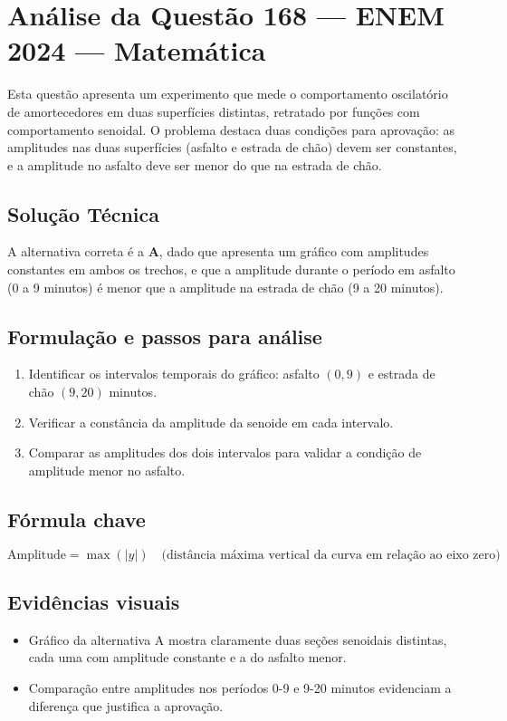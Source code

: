\documentclass{article}
\begin{document}
\section*{Análise da Questão 168 — ENEM 2024 — Matemática}

Esta questão apresenta um experimento que mede o comportamento oscilatório de amortecedores em duas superfícies distintas, retratado por funções com comportamento senoidal. O problema destaca duas condições para aprovação: as amplitudes nas duas superfícies (asfalto e estrada de chão) devem ser constantes, e a amplitude no asfalto deve ser menor do que na estrada de chão.

\subsection*{Solução Técnica}
A alternativa correta é a \textbf{A}, dado que apresenta um gráfico com amplitudes constantes em ambos os trechos, e que a amplitude durante o período em asfalto (0 a 9 minutos) é menor que a amplitude na estrada de chão (9 a 20 minutos).

\subsection*{Formulação e passos para análise}
\begin{enumerate}
  \item Identificar os intervalos temporais do gráfico: asfalto $(0,9)$ e estrada de chão $(9,20)$ minutos.
  \item Verificar a constância da amplitude da senoide em cada intervalo.
  \item Comparar as amplitudes dos dois intervalos para validar a condição de amplitude menor no asfalto.
\end{enumerate}

\subsection*{Fórmula chave}
\[
\text{Amplitude} = \max(|y|)\quad \text{(distância máxima vertical da curva em relação ao eixo zero)}
\]

\subsection*{Evidências visuais}
\begin{itemize}
  \item Gráfico da alternativa A mostra claramente duas seções senoidais distintas, cada uma com amplitude constante e a do asfalto menor.
  \item Comparação entre amplitudes nos períodos 0-9 e 9-20 minutos evidenciam a diferença que justifica a aprovação.
\end{itemize}
\end{document}
